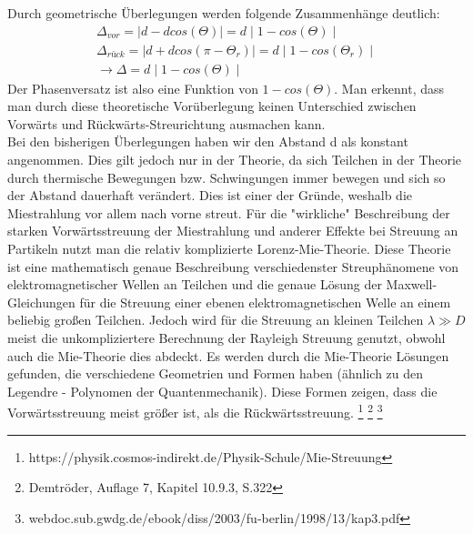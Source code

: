 Durch geometrische Überlegungen werden folgende Zusammenhänge deutlich:
\begin{align*}
\Delta_{vor}=\mid d-dcos(\Theta)\mid=d\mid 1-cos(\Theta) \mid\\
\Delta_{rück}=\mid d+dcos(\pi-\Theta_r)\mid=d\mid 1-cos(\Theta_r) \mid\\
\rightarrow \Delta = d\mid 1-cos(\Theta) \mid
\end{align*}
Der Phasenversatz ist also eine Funktion von $1-cos(\Theta)$.
Man erkennt, dass man durch diese theoretische Vorüberlegung keinen Unterschied zwischen Vorwärts und Rückwärts-Streurichtung ausmachen kann. \\
Bei den bisherigen Überlegungen haben wir den Abstand d als konstant angenommen. Dies gilt jedoch nur in der Theorie, da sich Teilchen in der Theorie durch thermische Bewegungen bzw. Schwingungen immer bewegen und sich so der Abstand dauerhaft verändert. Dies ist einer der Gründe, weshalb die Miestrahlung vor allem nach vorne streut. 
Für die "wirkliche" Beschreibung der starken Vorwärtsstreuung der Miestrahlung und anderer Effekte bei Streuung an Partikeln nutzt man die relativ komplizierte Lorenz-Mie-Theorie. Diese Theorie ist eine mathematisch genaue Beschreibung verschiedenster Streuphänomene von elektromagnetischer Wellen an Teilchen und die genaue Lösung der Maxwell-Gleichungen für die Streuung einer ebenen elektromagnetischen Welle an einem beliebig großen Teilchen. Jedoch wird für die Streuung an kleinen Teilchen $\lambda\gg D$ meist die unkompliziertere Berechnung der Rayleigh Streuung genutzt, obwohl auch die Mie-Theorie dies abdeckt. Es werden durch die Mie-Theorie Lösungen gefunden, die verschiedene Geometrien und Formen haben (ähnlich zu den Legendre - Polynomen der Quantenmechanik). Diese Formen zeigen, dass die Vorwärtsstreuung meist größer ist, als die Rückwärtsstreuung.
\footnote{https://physik.cosmos-indirekt.de/Physik-Schule/Mie-Streuung}
\footnote{Demtröder, Auflage 7, Kapitel 10.9.3, S.322}
\footnote{webdoc.sub.gwdg.de/ebook/diss/2003/fu-berlin/1998/13/kap3.pdf}